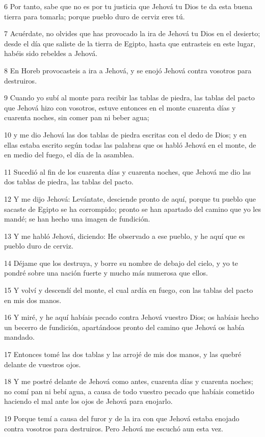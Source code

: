 \par 6 Por tanto, sabe que no es por tu justicia que Jehová tu Dios te da esta buena tierra para tomarla; porque pueblo duro de cerviz eres tú. 
\par 7 Acuérdate, no olvides que has provocado la ira de Jehová tu Dios en el desierto; desde el día que saliste de la tierra de Egipto, hasta que entrasteis en este lugar, habéis sido rebeldes a Jehová.
\par 8 En Horeb provocasteis a ira a Jehová, y se enojó Jehová contra vosotros para destruiros.
\par 9 Cuando yo subí al monte para recibir las tablas de piedra, las tablas del pacto que Jehová hizo con vosotros, estuve entonces en el monte cuarenta días y cuarenta noches, sin comer pan ni beber agua;
\par 10 y me dio Jehová las dos tablas de piedra escritas con el dedo de Dios; y en ellas estaba escrito según todas las palabras que os habló Jehová en el monte, de en medio del fuego, el día de la asamblea.
\par 11 Sucedió al fin de los cuarenta días y cuarenta noches, que Jehová me dio las dos tablas de piedra, las tablas del pacto.
\par 12 Y me dijo Jehová: Levántate, desciende pronto de aquí, porque tu pueblo que sacaste de Egipto se ha corrompido; pronto se han apartado del camino que yo les mandé; se han hecho una imagen de fundición.
\par 13 Y me habló Jehová, diciendo: He observado a ese pueblo, y he aquí que es pueblo duro de cerviz.
\par 14 Déjame que los destruya, y borre su nombre de debajo del cielo, y yo te pondré sobre una nación fuerte y mucho más numerosa que ellos.
\par 15 Y volví y descendí del monte, el cual ardía en fuego, con las tablas del pacto en mis dos manos.
\par 16 Y miré, y he aquí habíais pecado contra Jehová vuestro Dios; os habíais hecho un becerro de fundición, apartándoos pronto del camino que Jehová os había mandado.
\par 17 Entonces tomé las dos tablas y las arrojé de mis dos manos, y las quebré delante de vuestros ojos.
\par 18 Y me postré delante de Jehová como antes, cuarenta días y cuarenta noches; no comí pan ni bebí agua, a causa de todo vuestro pecado que habíais cometido haciendo el mal ante los ojos de Jehová para enojarlo. 
\par 19 Porque temí a causa del furor y de la ira con que Jehová estaba enojado contra vosotros para destruiros. Pero Jehová me escuchó aun esta vez.
